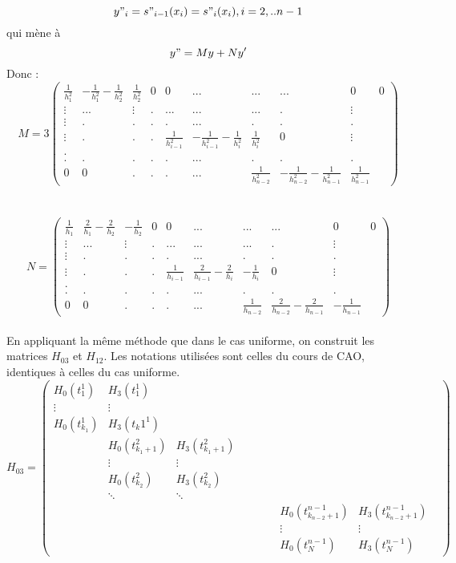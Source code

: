 \documentclass[a4paper,12pt]{article} %
\begin{document}
                $$y"_i=s"_{i-1}(x_i)=s"_i(x_i), i=2,..n-1$$
                qui mène à $$y"=My+Ny'$$ Donc :
                $$M=3\begin{pmatrix} \frac{1}{h_1^2}&-\frac{1}{h_1^2}-\frac{1}{h_2^2}&\frac{1}{h_2^2}&0&0&...&...&...&0&0 \\ \vdots&...&\vdots&.&...&...&...&.&\vdots \\ \vdots&.&.&.&.&...&.&.&.\\ \vdots&.&.&.&\frac{1}{h_{i-1}^2}&-\frac{1}{h_{i-1}^2}-\frac{1}{h_i^2}&\frac{1}{h_i^2}&0&\vdots \\. \\.&.&.&.&.&...&.&.&. \\ 0&0&.&.&.&...&\frac{1}{h_{n-2}^2}&-\frac{1}{h_{n-2}^2}-\frac{1}{h_{n-1}^2}&\frac{1}{h_{n-1}^2} \end{pmatrix}$$
                \\
                \\$$N=\begin{pmatrix} \frac{1}{h_1}&\frac{2}{h_1}-\frac{2}{h_2}&-\frac{1}{h_2}&0&0&...&...&...&0&0 \\ \vdots&...&\vdots&.&...&...&...&.&\vdots \\ \vdots&.&.&.&.&...&.&.&.\\ \vdots&.&.&.&\frac{1}{h_{i-1}}&\frac{2}{h_{i-1}}-\frac{2}{h_i}&-\frac{1}{h_i}&0&\vdots \\. \\.&.&.&.&.&...&.&.&. \\ 0&0&.&.&.&...&\frac{1}{h_{n-2}}&\frac{2}{h_{n-2}}-\frac{2}{h_{n-1}}&-\frac{1}{h_{n-1}} \end{pmatrix}$$\\
                
                En appliquant la même méthode que dans le cas uniforme, on construit les matrices $H_{03}$ et $H_{12}$. Les notations utilisées sont celles du cours de CAO, identiques à celles du cas uniforme.
                $$H_{03}=\begin{pmatrix} H_0(t_1^1)&H_3(t_1^1)& & & & & & & &  \\ \vdots&\vdots& & & & & & &  \\ H_0(t_{k_1}^1)&H_3(t_k1^1)& & & & & & & \\ &H_0(t_{{k_1}+1}^2)&H_3(t_{{k_1}+1}^2)& & & & & &   \\ &\vdots&\vdots& & & & & &  \\ &H_0(t_{k_2}^2)&H_3(t_{k_2}^2)& & & & & & \\ &\ddots&\ddots & & & & & & & \\ & & & & & & &H_0(t_{{k_{n-2}}+1}^{n-1}) &H_3(t_{{k_{n-2}}+1}^{n-1})\\ & & & & & & &\vdots &\vdots\\ & & & & & & &H_0(t_N^{n-1}) &H_3(t_N^{n-1}) \end{pmatrix}$$
                
\end{document}
